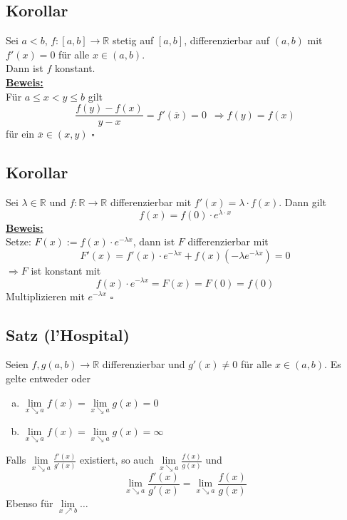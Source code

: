 \subsection{Korollar} %
\label{sub:korolllar}
Sei $a<b$, $f : [a,b] \to \mathds{R}$ stetig auf $[a,b]$, differenzierbar auf $(a,b)$ mit $f'(x)=0$ für alle $x \in (a,b)$.\\
Dann ist $f$ konstant.
\vspace{10pt} \\
\underline{\textbf{Beweis:}} \\
Für $a \le x < y \le b$ gilt
\[
	\frac{f(y)- f(x)}{y-x} = f'(\overline{x}) = 0 \enspace \Rightarrow f(y)= f(x)
\]
für ein $\overline{x} \in (x,y)$ \hfill \( \square \)


\subsection{Korollar} %
\label{sub:Korollar}
Sei $\lambda \in \mathds{R}$ und $f : \mathds{R} \to \mathds{R}$ differenzierbar mit $f'(x)= \lambda \cdot f(x)$. Dann gilt
\[
	f(x)= f(0) \cdot e^{\lambda \cdot x}
\]
\underline{\textbf{Beweis:}} \\
Setze: $F(x) := f(x) \cdot  e^{- \lambda x}$, dann ist $F$ differenzierbar mit 
\[
	F'(x) = f'(x) \cdot e^{- \lambda x} + f(x) (- \lambda e^{- \lambda x}) = 0
\]
$\Rightarrow F$ ist konstant mit 
\[
	f(x) \cdot e^{- \lambda x}=F(x)= F(0)= f(0) 
\]
Multiplizieren mit $e^{- \lambda x}$ \hfill \( \square \)

\subsection{Satz (l'Hospital)} %
\label{sub:satz}
Seien $f,g (a,b) \to \mathds{R}$ differenzierbar und $g'(x) \not= 0$ für alle $x \in (a,b)$. Es gelte entweder oder
\begin{enumerate}[a)]
	\item $\lim\limits_{x \searrow a}f(x) = \lim\limits_{x \searrow a} g(x) = 0  $
	\item $\lim\limits_{x \searrow a} f(x) = \lim\limits_{x \searrow a}g(x) = \infty $
\end{enumerate}
Falls $\lim\limits_{x \searrow a} \frac{f'(x)}{g'(x)} $ existiert, so auch $\lim\limits_{x \searrow a} \frac{f(x)}{g(x)} $ und 
\[
	\lim\limits_{x \searrow a} \frac{f'(x)}{g'(x)} = \lim\limits_{x \searrow a} \frac{f(x)}{g(x)}  
\]
Ebenso für $\lim\limits_{x \nearrow b} \ldots $


